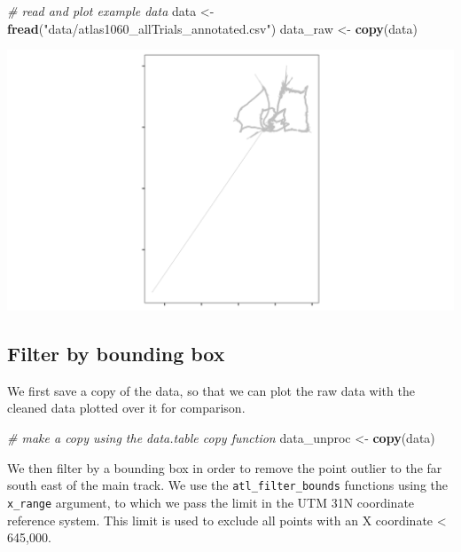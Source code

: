 \documentclass[]{scrartcl}
\newenvironment{Shaded}{}{}
\newcommand{\CommentTok}[1]{\textcolor[rgb]{0.38,0.63,0.69}{\textit{#1}}}
\newcommand{\KeywordTok}[1]{\textcolor[rgb]{0.00,0.44,0.13}{\textbf{#1}}}
\newcommand{\NormalTok}[1]{#1}
\newcommand{\StringTok}[1]{\textcolor[rgb]{0.25,0.44,0.63}{#1}}
\begin{document}
\begin{Shaded}
\begin{Highlighting}[]
\CommentTok{# read and plot example data}
\NormalTok{data <-}\StringTok{ }\KeywordTok{fread}\NormalTok{(}\StringTok{"data/atlas1060_allTrials_annotated.csv"}\NormalTok{)}
\NormalTok{data_raw <-}\StringTok{ }\KeywordTok{copy}\NormalTok{(data)}
\end{Highlighting}
\end{Shaded}

\includegraphics{figures/fig_calibration_raw.png}

\hypertarget{filter-by-bounding-box}{%
\subsection{Filter by bounding box}\label{filter-by-bounding-box}}

We first save a copy of the data, so that we can plot the raw data with the cleaned data plotted over it for comparison.

\begin{Shaded}
\begin{Highlighting}[]
\CommentTok{# make a copy using the data.table copy function}
\NormalTok{data_unproc <-}\StringTok{ }\KeywordTok{copy}\NormalTok{(data)}
\end{Highlighting}
\end{Shaded}

We then filter by a bounding box in order to remove the point outlier to the far south east of the main track. We use the \texttt{atl\_filter\_bounds} functions using the \texttt{x\_range} argument, to which we pass the limit in the UTM 31N coordinate reference system.
This limit is used to exclude all points with an X coordinate \textless{} 645,000.
\end{document}
